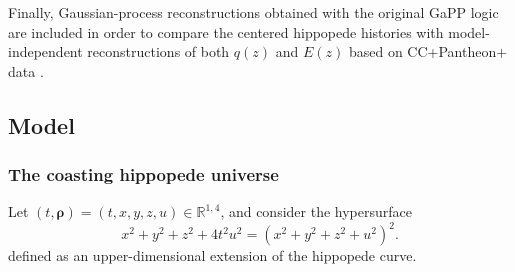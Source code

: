 \documentclass[3p,times,twocolumn]{elsarticle}
\renewcommand{\vec}[1]{\boldsymbol{#1}}
\begin{document}
Finally, Gaussian-process reconstructions obtained with the original GaPP logic are included in order to compare the centered hippopede histories with model-independent reconstructions of both $q(z)$ and $E(z)$ based on CC+Pantheon$+$ data \cite{seikel2012gapp}.



\subsection{Model}

\subsubsection{The coasting hippopede universe}

Let $(t, \vec \rho) = (t,x,y,z,u)\in\mathbb{R}^{1,4}$, and consider the hypersurface
\begin{equation}
\label{eq:hippopede_univ}
 x^2 + y^2 + z^2 + 4t^2 u^2 = (x^2 + y^2 + z^2 + u^2)^2 .
\end{equation}
defined as an upper-dimensional extension of the hippopede curve.
\end{document}
